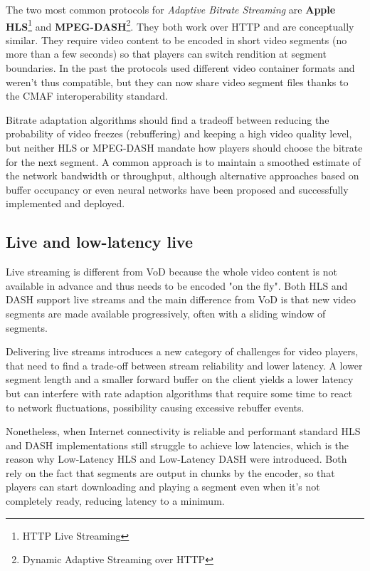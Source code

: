 The two most common protocols for \textit{Adaptive Bitrate Streaming} are \textbf{Apple HLS}\footnote{HTTP Live Streaming} and \textbf{MPEG-DASH}\footnote{Dynamic Adaptive Streaming over HTTP}. They both work over HTTP and are conceptually similar. They require video content to be encoded in short video segments (no more than a few seconds) so that players can switch rendition at segment boundaries. In the past the protocols used different video container formats and weren't thus compatible, but they can now share video segment files thanks to the CMAF interoperability standard.


Bitrate adaptation algorithms should find a tradeoff between reducing the probability of video freezes (rebuffering) and keeping a high video quality level, but neither HLS or MPEG-DASH mandate how players should choose the bitrate for the next segment. A common approach is to maintain a smoothed estimate of the network bandwidth or throughput, although alternative approaches based on buffer occupancy or even neural networks have been proposed and successfully implemented and deployed.\cite{bola}\cite{neural}

\subsection{Live and low-latency live}
\label{sec:intro/live}

Live streaming is different from VoD because the whole video content is not available in advance and thus needs to be encoded "on the fly". Both HLS and DASH support live streams and the main difference from VoD is that new video segments are made available progressively, often with a sliding window of segments.

Delivering live streams introduces a new category of challenges for video players, that need to find a trade-off between stream reliability and lower latency. A lower segment length and a smaller forward buffer on the client yields a lower latency but can interfere with rate adaption algorithms that require some time to react to network fluctuations, possibility causing excessive rebuffer events.

Nonetheless, when Internet connectivity is reliable and performant standard HLS and DASH implementations still struggle to achieve low latencies, which is the reason why Low-Latency HLS and Low-Latency DASH were introduced. Both rely on the fact that segments are output in chunks by the encoder, so that players can start downloading and playing a segment even when it's not completely ready, reducing latency to a minimum.

